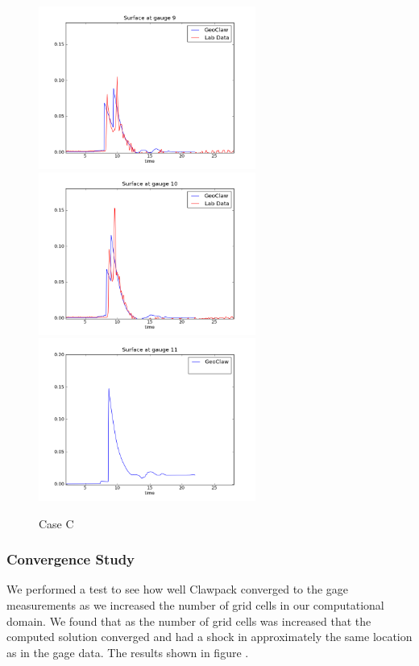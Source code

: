 \begin{figure}[ht]
\hfil\includegraphics[width=2.8in]{bp5/CaseC/gauge0009fig300.png}\hfil
\vskip 5pt
\hfil\includegraphics[width=2.8in]{bp5/CaseC/gauge0010fig300.png}\hfil
\hfil\includegraphics[width=2.8in]{bp5/CaseC/gauge0011fig300.png}\hfil
\caption{\label{fig:bp5C} Case C }
\end{figure}

\subsubsection{Convergence Study}
We performed a test to see how well Clawpack converged to the gage measurements as we increased the number of grid cells in our computational domain.  We found that as the number of grid cells was increased that the computed solution converged and had a shock in approximately the same location as in the gage data.  The results shown in figure .

